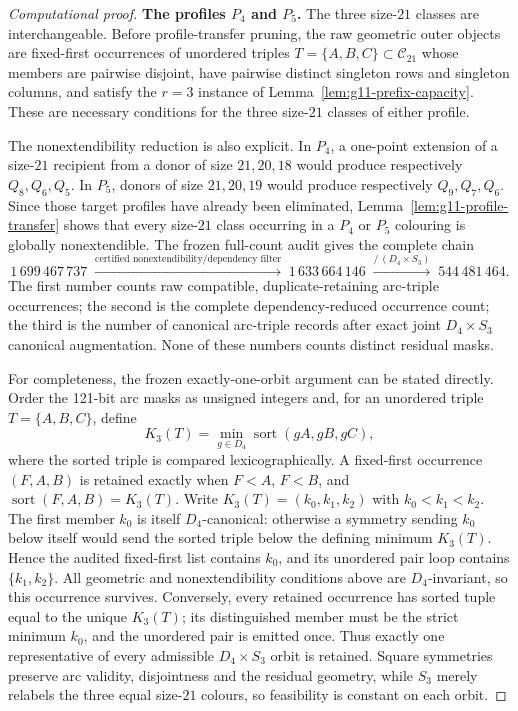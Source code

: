 \documentclass[11pt]{article}
\theoremstyle{definition}
\theoremstyle{remark}
\newcommand{\Dfour}{D_4}
\begin{document}
\begin{proof}[Computational proof]
\medskip\noindent\textbf{The profiles \(P_4\) and \(P_5\).}\quad
The three size-\(21\) classes are interchangeable.  Before profile-transfer
pruning, the raw geometric outer objects are fixed-first occurrences of
unordered triples \(T=\{A,B,C\}\subset\mathcal C_{21}\) whose members are
pairwise disjoint, have pairwise distinct singleton rows and singleton
columns, and satisfy the \(r=3\) instance of
Lemma~\ref{lem:g11-prefix-capacity}.  These are necessary conditions for the
three size-\(21\) classes of either profile.

The nonextendibility reduction is also explicit.  In \(P_4\), a one-point
extension of a size-\(21\) recipient from a donor of size \(21,20,18\) would
produce respectively \(Q_8,Q_6,Q_5\).  In \(P_5\), donors of size
\(21,20,19\) would produce respectively \(Q_9,Q_7,Q_6\).  Since those target
profiles have already been eliminated, Lemma~\ref{lem:g11-profile-transfer}
shows that every size-\(21\) class occurring in a \(P_4\) or \(P_5\) colouring
is globally nonextendible.  The frozen full-count audit gives the complete
chain
\[
  1\,699\,467\,737
  \;\xrightarrow{\text{certified nonextendibility/dependency filter}}\;
  1\,633\,664\,146
  \;\xrightarrow{/\,(\Dfour\times S_3)}\;
  544\,481\,464.
\]
The first number counts raw compatible, duplicate-retaining arc-triple
occurrences; the second is the complete dependency-reduced occurrence count;
the third is the number of canonical arc-triple records after exact joint
\(\Dfour\times S_3\) canonical augmentation.  None of these numbers counts
distinct residual masks.

For completeness, the frozen exactly-one-orbit argument can be stated directly.
Order the 121-bit arc masks as unsigned integers and, for an unordered triple
\(T=\{A,B,C\}\), define
\[
 K_3(T)=\min_{g\in\Dfour}\operatorname{sort}(gA,gB,gC),
\]
where the sorted triple is compared lexicographically.  A fixed-first
occurrence \((F,A,B)\) is retained exactly when \(F<A\), \(F<B\), and
\(\operatorname{sort}(F,A,B)=K_3(T)\).  Write
\(K_3(T)=(k_0,k_1,k_2)\) with \(k_0<k_1<k_2\).  The first member \(k_0\) is
itself \(\Dfour\)-canonical: otherwise a symmetry sending \(k_0\) below itself
would send the sorted triple below the defining minimum \(K_3(T)\).  Hence the
audited fixed-first list contains \(k_0\), and its unordered pair loop contains
\(\{k_1,k_2\}\).  All geometric and nonextendibility conditions above are
\(\Dfour\)-invariant, so this occurrence survives.  Conversely, every retained
occurrence has sorted tuple equal to the unique \(K_3(T)\); its distinguished
member must be the strict minimum \(k_0\), and the unordered pair is emitted
once.  Thus exactly one representative of every admissible
\(\Dfour\times S_3\) orbit is retained.  Square symmetries preserve arc validity,
disjointness and the residual geometry, while \(S_3\) merely relabels the
three equal size-\(21\) colours, so feasibility is constant on each orbit.


\end{proof}
\end{document}
